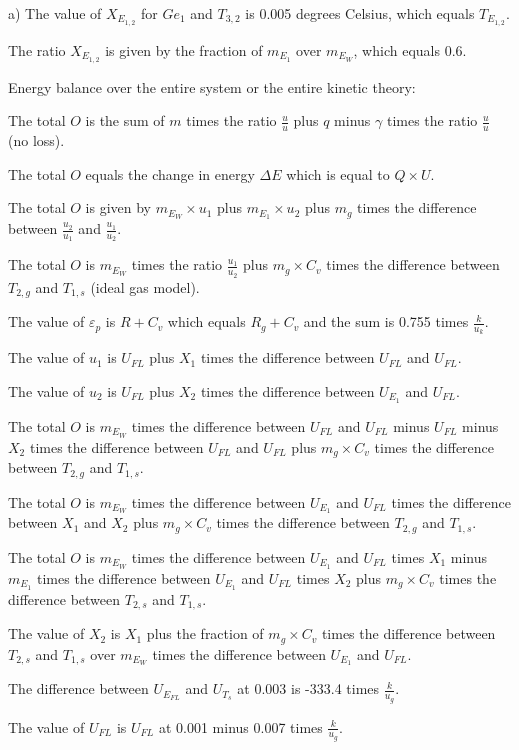 a) The value of \( X_{E_{1,2}} \) for \( Ge_1 \) and \( T_{3,2} \) is 0.005 degrees Celsius, which equals \( T_{E_{1,2}} \).

The ratio \( X_{E_{1,2}} \) is given by the fraction of \( m_{E_{1}} \) over \( m_{E_{W}} \), which equals 0.6.

Energy balance over the entire system or the entire kinetic theory:

The total \( O \) is the sum of \( m \) times the ratio \( \frac{u}{u} \) plus \( q \) minus \( \gamma \) times the ratio \( \frac{u}{u} \) (no loss).

The total \( O \) equals the change in energy \( \Delta E \) which is equal to \( Q \times U \).

The total \( O \) is given by \( m_{E_{W}} \times u_{1} \) plus \( m_{E_{1}} \times u_{2} \) plus \( m_{g} \) times the difference between \( \frac{u_{2}}{u_{1}} \) and \( \frac{u_{1}}{u_{2}} \).

The total \( O \) is \( m_{E_{W}} \) times the ratio \( \frac{u_{1}}{u_{2}} \) plus \( m_{g} \times C_{v} \) times the difference between \( T_{2,g} \) and \( T_{1,s} \) (ideal gas model).

The value of \( \varepsilon_{p} \) is \( R + C_{v} \) which equals \( R_{g} + C_{v} \) and the sum is 0.755 times \( \frac{k}{u_{k}} \).

The value of \( u_{1} \) is \( U_{FL} \) plus \( X_{1} \) times the difference between \( U_{FL} \) and \( U_{FL} \).

The value of \( u_{2} \) is \( U_{FL} \) plus \( X_{2} \) times the difference between \( U_{E_{1}} \) and \( U_{FL} \).

The total \( O \) is \( m_{E_{W}} \) times the difference between \( U_{FL} \) and \( U_{FL} \) minus \( U_{FL} \) minus \( X_{2} \) times the difference between \( U_{FL} \) and \( U_{FL} \) plus \( m_{g} \times C_{v} \) times the difference between \( T_{2,g} \) and \( T_{1,s} \).

The total \( O \) is \( m_{E_{W}} \) times the difference between \( U_{E_{1}} \) and \( U_{FL} \) times the difference between \( X_{1} \) and \( X_{2} \) plus \( m_{g} \times C_{v} \) times the difference between \( T_{2,g} \) and \( T_{1,s} \).

The total \( O \) is \( m_{E_{W}} \) times the difference between \( U_{E_{1}} \) and \( U_{FL} \) times \( X_{1} \) minus \( m_{E_{1}} \) times the difference between \( U_{E_{1}} \) and \( U_{FL} \) times \( X_{2} \) plus \( m_{g} \times C_{v} \) times the difference between \( T_{2,s} \) and \( T_{1,s} \).

The value of \( X_{2} \) is \( X_{1} \) plus the fraction of \( m_{g} \times C_{v} \) times the difference between \( T_{2,s} \) and \( T_{1,s} \) over \( m_{E_{W}} \) times the difference between \( U_{E_{1}} \) and \( U_{FL} \).

The difference between \( U_{E_{FL}} \) and \( U_{T_{s}} \) at 0.003 is -333.4 times \( \frac{k}{u_{g}} \).

The value of \( U_{FL} \) is \( U_{FL} \) at 0.001 minus 0.007 times \( \frac{k}{u_{g}} \).